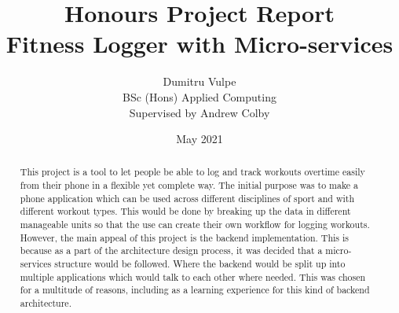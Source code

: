 \documentclass{article}
\title{Honours Project Report\\Fitness Logger with Micro-services}
\author{Dumitru Vulpe\\BSc (Hons) Applied Computing\\Supervised by Andrew Colby}
\date{May 2021}
\begin{document}
\maketitle

\vspace*{\fill/2}
\begin{abstract} 

This project is a tool to let people be able to log and track workouts overtime easily from their phone in a flexible yet complete way. The initial purpose was to make a phone application which can be used across different disciplines of sport and with different workout types. This would be done by breaking up the data in different manageable units so that the use can create their own workflow for logging workouts.\\
However, the main appeal of this project is the backend implementation. This is because as a part of the architecture design process, it was decided that a micro-services structure would be followed. Where the backend would be split up into multiple applications which would talk to each other where needed. This was chosen for a multitude of reasons, including as a learning experience for this kind of backend architecture.\\

\end{abstract}
\vspace*{\fill}

\newpage
\tableofcontents 
\listoffigures
\newpage
\end{document}
